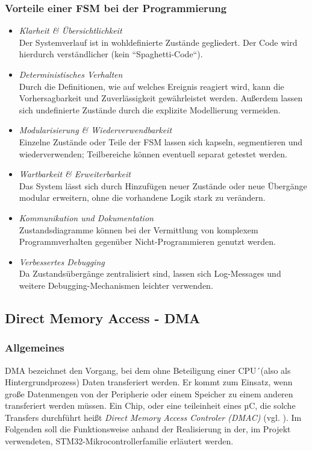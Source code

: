 \documentclass[a4paper, portrait, 12pt]{scrartcl} %
\begin{document}
\subsubsection{Vorteile einer FSM bei der Programmierung}
\begin{itemize}
	\item \emph{Klarheit \& Übersichtlichkeit}\\
	Der Systemverlauf ist in wohldefinierte Zustände gegliedert. Der Code wird hierdurch verständlicher (kein ``Spaghetti-Code``).
	\item \emph{Deterministisches Verhalten}\\
	Durch die Definitionen, wie auf welches Ereignis reagiert wird, kann die Vorhersagbarkeit und Zuverlässigkeit gewährleistet werden. Außerdem lassen sich undefinierte Zustände durch die explizite Modellierung vermeiden.
	\item \emph{Modularisierung \& Wiederverwendbarkeit}\\
	Einzelne Zustände oder Teile der FSM lassen sich kapseln, segmentieren und wiederverwenden; Teilbereiche können eventuell separat getestet werden.
	\item \emph{Wartbarkeit \& Erweiterbarkeit}\\
	Das System lässt sich durch Hinzufügen neuer Zustände oder neue Übergänge modular erweitern, ohne die vorhandene Logik stark zu verändern.
	\item \emph{Kommunikation und Dokumentation}\\
	Zustandsdiagramme können bei der Vermittlung von komplexem Programmverhalten gegenüber Nicht-Programmieren genutzt werden.
	\item \emph{Verbessertes Debugging}\\
	Da Zustandsübergänge zentralisiert sind, lassen sich Log-Messages und weitere Debugging-Mechanismen leichter verwenden.
\end{itemize}

\subsection{Direct Memory Access - DMA}
\subsubsection{Allgemeines}
DMA bezeichnet den Vorgang, bei dem  ohne Beteiligung einer CPU´(also als Hintergrundprozess) Daten transferiert werden. Er kommt zum Einsatz, wenn große Datenmengen von der Peripherie oder einem Speicher zu einem anderen transferiert werden müssen. Ein Chip, oder eine teileinheit eines µC, die solche Transfers durchführt heißt \emph{Direct Memory Access Controler (DMAC)} (vgl. \cite[S. 125]{Urbanek2020}). Im Folgenden soll die Funktionsweise anhand der Realisierung in der, im Projekt verwendeten, STM32-Mikrocontrollerfamilie erläutert werden.
\end{document}
